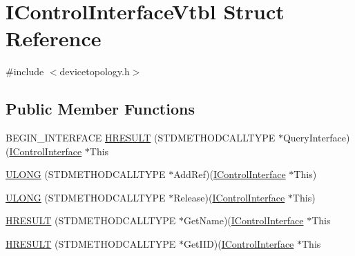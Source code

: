 \hypertarget{struct_i_control_interface_vtbl}{}\section{I\+Control\+Interface\+Vtbl Struct Reference}
\label{struct_i_control_interface_vtbl}


{\ttfamily \#include $<$devicetopology.\+h$>$}

\subsection*{Public Member Functions}
\begin{DoxyCompactItemize}
\item 
B\+E\+G\+I\+N\+\_\+\+I\+N\+T\+E\+R\+F\+A\+CE \hyperlink{struct_i_control_interface_vtbl_af95101b3d959210d98d098a9852331b5}{H\+R\+E\+S\+U\+LT} (S\+T\+D\+M\+E\+T\+H\+O\+D\+C\+A\+L\+L\+T\+Y\+PE $\ast$Query\+Interface)(\hyperlink{devicetopology_8h_a94ee688dc4631dcf7de2afa695948185}{I\+Control\+Interface} $\ast$This
\item 
\hyperlink{struct_i_control_interface_vtbl_a5554c2252ca4b95c3b937f269f79d18a}{U\+L\+O\+NG} (S\+T\+D\+M\+E\+T\+H\+O\+D\+C\+A\+L\+L\+T\+Y\+PE $\ast$Add\+Ref)(\hyperlink{devicetopology_8h_a94ee688dc4631dcf7de2afa695948185}{I\+Control\+Interface} $\ast$This)
\item 
\hyperlink{struct_i_control_interface_vtbl_a92d081e5b40c248b9d620145e26baed8}{U\+L\+O\+NG} (S\+T\+D\+M\+E\+T\+H\+O\+D\+C\+A\+L\+L\+T\+Y\+PE $\ast$Release)(\hyperlink{devicetopology_8h_a94ee688dc4631dcf7de2afa695948185}{I\+Control\+Interface} $\ast$This)
\item 
\hyperlink{struct_i_control_interface_vtbl_a198a1515d40adb4a80785da8dfdf1cc9}{H\+R\+E\+S\+U\+LT} (S\+T\+D\+M\+E\+T\+H\+O\+D\+C\+A\+L\+L\+T\+Y\+PE $\ast$Get\+Name)(\hyperlink{devicetopology_8h_a94ee688dc4631dcf7de2afa695948185}{I\+Control\+Interface} $\ast$This
\item 
\hyperlink{struct_i_control_interface_vtbl_a1734bf7605595a03ce1dcb9f474967c6}{H\+R\+E\+S\+U\+LT} (S\+T\+D\+M\+E\+T\+H\+O\+D\+C\+A\+L\+L\+T\+Y\+PE $\ast$Get\+I\+ID)(\hyperlink{devicetopology_8h_a94ee688dc4631dcf7de2afa695948185}{I\+Control\+Interface} $\ast$This
\end{DoxyCompactItemize}
